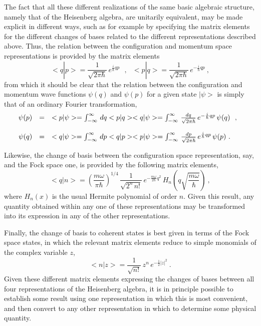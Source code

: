 \documentclass[a4paper,11pt]{article}
\begin{document}
The fact that all these different realizations of the same basic
algebraic structure, namely that of the Heisenberg algebra, are unitarily
equivalent, may be made explicit in different ways, such as for example
by specifying the matrix elements for the different changes of bases
related to the different representations described above.
Thus, the relation between the configuration and momentum space
representations is provided by the matrix elements
\begin{equation}
<q|p>=\frac{1}{\sqrt{2\pi\hbar}}\,e^{\frac{i}{\hbar}qp}\ \ \ ,\ \ \ 
<p|q>=\frac{1}{\sqrt{2\pi\hbar}}\,e^{-\frac{i}{\hbar}qp}\ ,
\end{equation}
from which it should be clear that the relation between the configuration
and momentum wave functions $\psi(q)$ and $\psi(p)$ for a given state
$|\psi>$ is simply that of an ordinary Fourier transformation,
\begin{equation}
\begin{array}{r c l}
\psi(p)&=&<p|\psi>=\int_{-\infty}^\infty\,dq<p|q><q|\psi>=
\int_{-\infty}^\infty\,\frac{dq}{\sqrt{2\pi\hbar}}\,e^{-\frac{i}{\hbar}qp}\,
\psi(q)\ \ ,\ \ \\
 & & \\
\psi(q)&=&<q|\psi>=\int_{-\infty}^\infty\,dp<q|p><p|\psi>=
\int_{-\infty}^\infty\,\frac{dp}{\sqrt{2\pi\hbar}}\,
e^{\frac{i}{\hbar}qp}\,\psi(p)\ .
\end{array}
\end{equation}

Likewise, the change of basis between the configuration space
representation, say, and the Fock space one, is provided by the
following matrix elements,
\begin{equation}
<q|n>=\left(\frac{m\omega}{\pi\hbar}\right)^{1/4}\,\frac{1}{\sqrt{2^n\,n!}}\,
e^{-\frac{m\omega}{2\hbar}q^2}\,H_n\left(q\sqrt{\frac{m\omega}{\hbar}}\right)\ ,
\end{equation}
where $H_n(x)$ is the usual Hermite polynomial of order $n$. Given this
result, any quantity obtained within any one of these representations may be
transformed into its expression in any of the other representations.

Finally, the change of basis to coherent states is best given in terms
of the Fock space states, in which the relevant matrix elements reduce
to simple monomials of the complex variable $z$,
\begin{equation}
<n|z>=\frac{1}{\sqrt{n!}}\,z^n\,e^{-\frac{1}{2}|z|^2}\ .
\end{equation}
Given these different matrix elements expressing the changes of bases
between all four representations of the Heisenberg algebra, it is in
principle possible to establish some result using one representation
in which this is most convenient, and then convert to any other
representation in which to determine some physical quantity.
\end{document}
